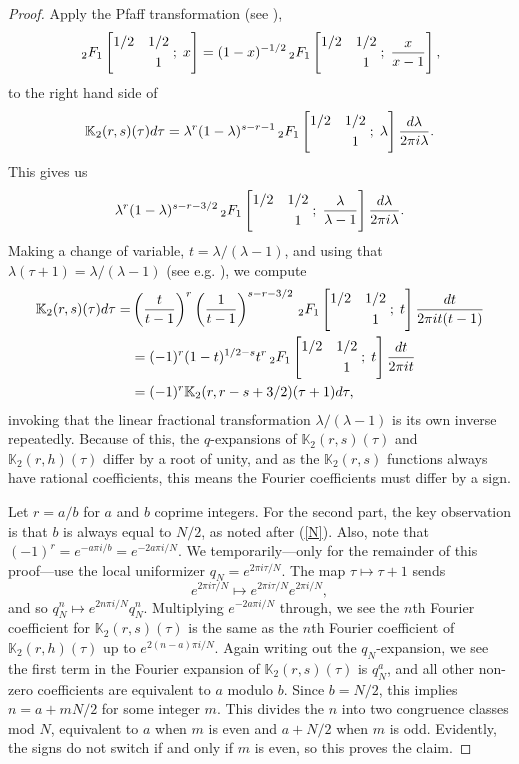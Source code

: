\documentclass[12pt]{amsart}
\theoremstyle{definition}
\theoremstyle{remark}
\newcommand*\HYPERskip{&}
\newcommand*\pfq{
\begingroup
\catcode`\,\active
\def ,{\HYPERskip}
\doHyper
}
\def\doHyper#1#2#3#4#5{
\, _{#1}F_{#2}\left[\begin{matrix}#3 \smallskip \\  #4\end{matrix} \; ; \; #5\right]
\endgroup
}
\begin{document}
\begin{proof}
    Apply the Pfaff transformation (see \cite{aar}), $$\pfq{2}{1}{1/2,1/2}{,1}{x}=(1-x)^{-1/2}\pfq{2}{1}{1/2,1/2}{,1}{\frac{x}{x-1}},$$ to the right hand side of $$\mathbb{K}_2(r,s)(\tau)d\tau=\lambda^r(1-\lambda)^{s-r-1}\pfq{2}{1}{1/2,1/2}{,1}{\lambda}\frac{d\lambda}{2\pi i\lambda}.$$ This gives us $$\lambda^{r}(1-\lambda)^{s-r-3/2}\pfq{2}{1}{1/2,1/2}{,1}{\frac{\lambda}{\lambda-1}}\frac{d\lambda}{2\pi i\lambda}.$$ Making a change of variable, $t=\lambda/(\lambda-1)$, and using that $\lambda(\tau+1)=\lambda/(\lambda-1)$ (see e.g. \cite{yoshida}), we compute \begin{align*}
        \mathbb{K}_2(r,s)(\tau)d\tau=&\left(\frac{t}{t-1}\right)^r\left(\frac{1}{t-1}\right)^{s-r-3/2}\pfq{2}{1}{1/2&1/2}{&1}{t}\frac{dt}{2\pi it(t-1)}\\&=(-1)^r(1-t)^{1/2-s}t^r\pfq{2}{1}{1/2&1/2}{&1}{t}\frac{dt}{2\pi it}\\&=(-1)^r\mathbb{K}_2(r,r-s+3/2)(\tau+1)d\tau,
    \end{align*}
    invoking that the linear fractional transformation $\lambda/(\lambda-1)$ is its own inverse repeatedly.  
    Because of this, the $q$-expansions of $\mathbb{K}_2(r,s)(\tau)$ and $\mathbb{K}_2(r,h)(\tau)$ differ by a root of unity, and as the $\mathbb{K}_2(r,s)$ functions always have rational coefficients, this means the Fourier coefficients must differ by a sign.

     Let $r=a/b$ for $a$ and $b$ coprime integers. For the second part, the key observation is that $b$ is always equal to $N/2$, as noted after (\ref{N}). Also, note that $(-1)^r=e^{-a\pi i/b}=e^{-2a\pi i/N}.$ We temporarily---only for the remainder of this proof---use the local uniformizer $q_N=e^{2\pi i\tau/N}$.
    The map $\tau\mapsto\tau+1$ sends $$e^{2\pi i\tau/N}\mapsto e^{2\pi i\tau/N}e^{2\pi i/N},$$ and so $q_N^n\mapsto e^{2n\pi i/N}q_N^n$. Multiplying $e^{-2a\pi i/N}$ through, we see the $n$th Fourier coefficient for $\mathbb{K}_2(r,s)(\tau)$ is the same as the $n$th Fourier coefficient of $\mathbb{K}_2(r,h)(\tau)$ up to $e^{2(n-a)\pi i/N}$. Again writing out the $q_N$-expansion, we see the first term in the Fourier expansion of $\mathbb{K}_2(r,s)(\tau)$ is $q_N^a$, and all other non-zero coefficients are equivalent to $a$ modulo $b$. Since $b=N/2$, this implies $n=a+mN/2$ for some integer $m$. This divides the $n$ into two congruence classes mod $N$, equivalent to $a$ when $m$ is even and $a+N/2$ when $m$ is odd. Evidently, the signs do not switch if and only if $m$ is even, so this proves the claim.
\end{proof}
\end{document}
